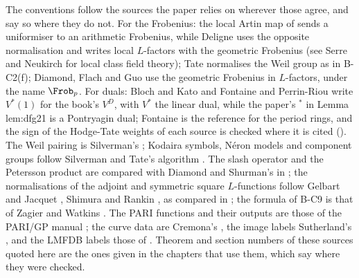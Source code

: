 The conventions follow the sources the paper relies on wherever those agree, and say so where they do not. For the Frobenius:
the local Artin map of  sends a uniformiser to an arithmetic Frobenius, while Deligne \cite{Deligne73}
uses the opposite normalisation and writes local $L$-factors with the geometric Frobenius (see Serre \cite{SerreLocalFields} and
Neukirch \cite{Neukirch} for local class field theory);
Tate \cite{Tate79} normalises the Weil group as in B-C2(f); Diamond, Flach and Guo \cite[1.1.1, 1.7.2]{DFG04} use the geometric
Frobenius in $L$-factors, under the name $\Frob_p$. For duals: Bloch and Kato \cite{BlochKato} and Fontaine and Perrin-Riou
\cite{FPR94} write $V^*(1)$ for the book's $V^D$, with $V^*$ the linear dual, while the paper's ${}^*$ in Lemma lem:dfg21 is a Pontryagin dual; Fontaine \cite{Fontaine} is
the reference for the period rings, and the sign of the Hodge-Tate weights of each source is checked where it is cited
(). The Weil
pairing is Silverman's \cite[III.8]{SilvermanAEC}; Kodaira symbols, N\'eron models and component groups follow Silverman
\cite[IV.9]{SilvermanATAEC} and Tate's algorithm \cite{Tate75}. The slash operator and the Petersson product are compared with
Diamond and Shurman's \cite{DiamondShurman} in ; the normalisations of the adjoint and symmetric square
$L$-functions follow Gelbart and Jacquet \cite{GelbartJacquet}, Shimura \cite{Shimura75} and Rankin \cite{Rankin39}, as compared
in ; the formula of B-C9 is that of Zagier \cite{Zagier85} and Watkins \cite{Watkins02}. The PARI functions
and their outputs are those of the PARI/GP manual \cite{PARIusers}; the curve data are Cremona's \cite{Cremona97,ecdata}, the
image labels Sutherland's \cite{Sutherland16}, and the LMFDB labels those of \cite{LMFDB}. Theorem and section numbers of these
sources quoted here are the ones given in the chapters that use them, which say where they were checked.
